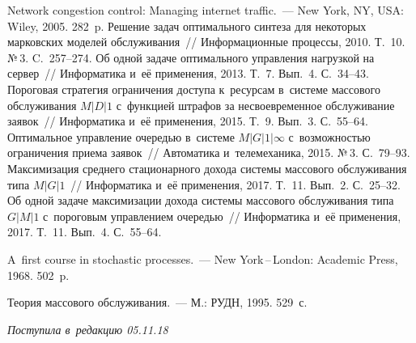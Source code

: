 \begin{multicols}{2}
{\small\frenchspacing
 {%
 \begin{thebibliography}{9}
 Network congestion control: Managing internet traffic.~--- 
New York, NY, USA: Wiley, 2005. 282~p.
 Решение задач оптимального синтеза для некоторых 
марковских моделей обслуживания~// Информационные процессы, 2010. 
Т.~10. №\,3. C.~257--274.
 Об одной задаче оптимального управ\-ле\-ния нагрузкой на сервер~// 
Информатика и~её применения, 2013. Т.~7. Вып.~4. С.~34--43.
 Пороговая стратегия ограничения доступа к~ресурсам 
в~системе массового обслуживания $M|D|1$ с~функцией
штрафов за несвоевременное обслуживание заявок~// Информатика и~её применения, 2015. 
Т.~9. Вып.~3.  С.~55--64.
 Оптимальное 
управление очередью в~системе 
$M|G|1|\infty$ 
с~возможностью ограничения приема 
заявок~// Автоматика и~телемеханика, 2015. №\,3. 
С.~79--93.
 Максимизация среднего стационарного дохода системы
массового обслуживания типа
 $M|G|1$~// Информатика и~её применения, 2017. Т.~11. Вып.~2. С.~25--32.
 Об одной задаче максимизации дохода 
сис\-те\-мы
массового обслуживания типа $G|M|1$ с~пороговым управ\-ле\-нием очередью~// Информатика и~её 
применения, 2017. Т.~11. Вып.~4. С.~55--64.

 A~first course in stochastic processes.~--- 
New York\,--\,London: Academic Press, 1968. 502~p.

 Теория массового обслуживания.~--- М.: РУДН,
1995. 529~с.


 \end{thebibliography}

 }
 }

\end{multicols}

\vspace*{-3pt}

\hfill{\small\textit{Поступила в~редакцию 05.11.18}}



\newpage

\vspace*{-29pt}

